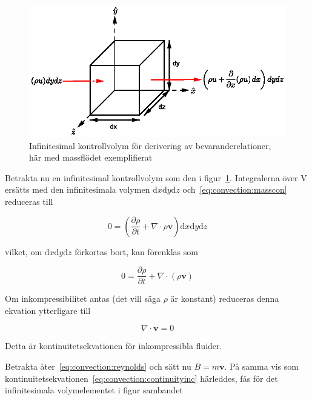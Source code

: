 \begin{figure}[hpbt]\centering
\includegraphics[scale=1]{images/massflowcube.eps}
\caption{Infinitesimal kontrollvolym för derivering av bevaranderelationer, här med massflödet exemplifierat}
\label{fig:massflowcube}
\end{figure}

Betrakta nu en infinitesimal kontrollvolym som den i figur~\ref{fig:massflowcube}. Integralerna över V ersätts med den infinitesimala volymen $\mathrm{d}x\mathrm{d}y\mathrm{d}z$ och~\eqref{eq:convection:masscon} reduceras till

\begin{equation}
\label{eq:convection:massconinf}
0 = \left( \frac{\partial \rho}{\partial t} + \nabla \cdot \rho \mathbf{v}\right) \mathrm{d}x\mathrm{d}y\mathrm{d}z
\end{equation}

vilket, om $\mathrm{d}x\mathrm{d}y\mathrm{d}z$ förkortas bort, kan förenklas som

\begin{equation}
\label{eq:convection:continuity}
\boxed{ \; \; \;
0 = \frac{\partial \rho}{\partial t} + \nabla \cdot \left( \rho \mathbf{v} \right) 
\; \; \; }
\end{equation}

Om inkompressibilitet antas (det vill säga $\rho$ är konstant) reduceras denna ekvation ytterligare till

\begin{equation}
\label{eq:convection:continuityinc}
\nabla \cdot \mathbf{v} = 0
\end{equation}

Detta är kontinuitetsekvationen för inkompressibla fluider.

Betrakta åter~\eqref{eq:convection:reynolds} och sätt nu $B = m\mathbf{v}$. På samma vis som kontinuitetsekvationen~\eqref{eq:convection:continuityinc} härleddes, fås för det infinitesimala volymelementet i figur sambandet

